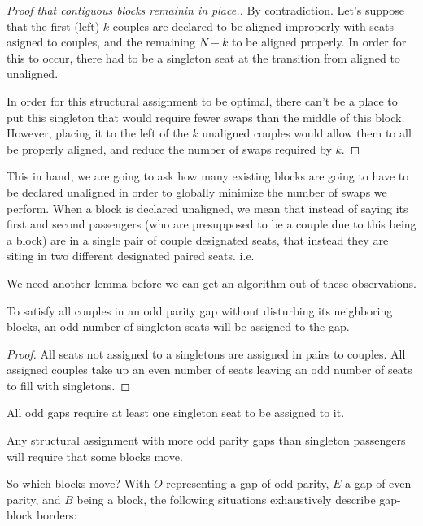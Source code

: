 \begin{proof}[Proof that contiguous blocks remainin in place.]
By contradiction.  Let's suppose that the first (left) $k$ couples are declared to be aligned improperly with seats asigned to couples, and the remaining $N-k$ to be aligned properly.  In order for this to occur, there had to be a singleton seat at the transition from aligned to unaligned.  

In order for this structural assignment to be optimal, there can't be a place to put this singleton that would require fewer swaps than the middle of this block.  However, placing it to the left of the $k$ unaligned couples would allow them to all be properly aligned, and reduce the number of swaps required by $k$.
\end{proof}

This in hand, we are going to ask how many existing blocks are going to have to be declared unaligned in order to globally minimize the number of swaps we perform. When a block is declared unaligned, we mean that instead of saying its first and second passengers (who are presupposed to be a couple due to this being a block) are in a single pair of couple designated seats, that instead they are siting in two different designated paired seats.  i.e.


We need another lemma before we can get an algorithm out of these observations.

\begin{lem} \label{lem:oddGapsNeedSingletons}
To satisfy all couples in an odd parity gap without disturbing its neighboring blocks, an odd number of singleton seats will be assigned to the gap.
\end{lem}

\begin{proof}
All seats not assigned to a singletons are assigned in pairs to couples.  All assigned couples take up an even number of seats leaving an odd number of seats to fill with singletons.
\end{proof}

\begin{cor}
All odd gaps require at least one singleton seat to be assigned to it.
\end{cor}

\begin{cor}
Any structural assignment with more odd parity gaps than singleton passengers will require that some blocks move.
\end{cor}

So which blocks move?  With $O$ representing a gap of odd parity, $E$ a gap of even parity, and $B$ being a block, the following situations exhaustively describe gap-block borders:

